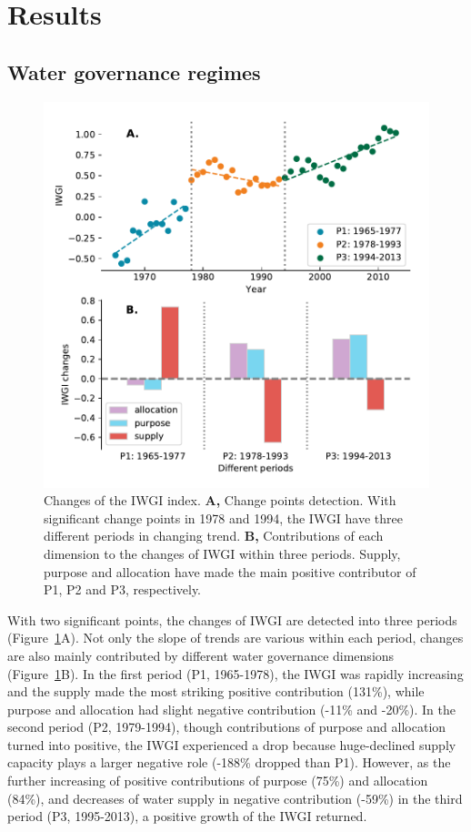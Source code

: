 \documentclass[9pt, twocolumn, twoside, lineno]{pnas-new}
\begin{document}
\section*{Results}
\subsection*{Water governance regimes}

\begin{figure}[ht!]
	\centering
	\includegraphics[width=\linewidth]{../../figures/main/index.pdf}
	\caption{Changes of the IWGI index. 
	\textbf{A,} Change points detection. With significant change points in 1978 and 1994, the IWGI have three different periods in changing trend.
	\textbf{B,} Contributions of each dimension to the changes of IWGI within three periods. Supply, purpose and allocation have made the main positive contributor of P1, P2 and P3, respectively.
	}
	\label{fig:IWGI}
\end{figure}

With two significant points, the changes of IWGI are detected into three periods (Figure~\ref{fig:IWGI}A). 
Not only the slope of trends are various within each period, changes are also mainly contributed by different water governance dimensions (Figure~\ref{fig:IWGI}B).
In the first period (P1, 1965-1978), the IWGI was rapidly increasing and the supply made the most striking positive contribution (131\%), while purpose and allocation had slight negative contribution (-11\% and -20\%).
In the second period (P2, 1979-1994), though contributions of purpose and allocation turned into positive, the IWGI experienced a drop because huge-declined supply capacity plays a larger negative role (-188\% dropped than P1). 
However, as the further increasing of positive contributions of purpose (75\%) and allocation (84\%), and decreases of water supply in negative contribution (-59\%) in the third period (P3, 1995-2013), a positive growth of the IWGI returned.
\end{document}
